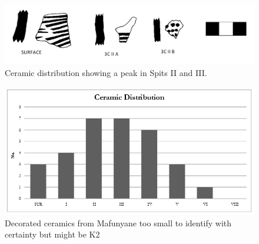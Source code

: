 	\begin{figure} %
		\includegraphics[width=\linewidth]{figures/Forssman-Figure07}
		\caption{Ceramic distribution showing a peak in Spits II and III.}
		\label{fig:Forssman-Figure07}
	\end{figure}
	
		\begin{figure} %
			\includegraphics[width=\linewidth]{figures/Forssman-Figure08}
			\caption{Decorated ceramics from Mafunyane too small to identify with certainty but might be K2}
			\label{fig:Forssman-Figure08}
		\end{figure}


